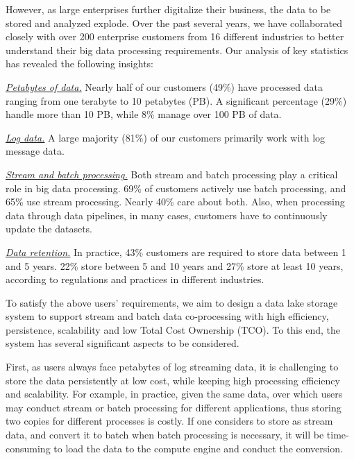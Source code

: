 However, as large enterprises further digitalize their business, the data to be stored and analyzed explode. Over the past several years, we have collaborated closely with over 200 enterprise customers from 16 different industries to better understand their big data processing requirements. Our analysis of key statistics has revealed the following insights:

\noindent \underline{\textit{Petabytes of data.}} Nearly half of our customers (49\%) have processed data ranging from one terabyte to 10 petabytes (PB). A significant percentage (29\%) handle more than 10 PB, while 8\% manage over 100 PB of data.


\noindent \underline{\textit{Log data.}} A large majority (81\%) of our customers primarily work with log message data.

\noindent \underline{\textit{Stream and batch processing.}} Both stream and batch processing play a critical role in big data processing. 69\% of  customers actively use batch processing, and 65\% use stream processing. Nearly 40\%  care about both. 
Also, when processing data through data pipelines, in many cases, customers  have to continuously  update the datasets.

\noindent \underline{\textit{Data retention.}} In practice, 43\% customers are required to store data between 1 and 5 years. 22\% store between 5 and 10 years and 27\% store at least 10 years, according to regulations and practices in different industries.




To satisfy the above users' requirements, we aim to design a data lake storage system to support stream and batch data co-processing with high efficiency, persistence, scalability and low Total Cost Ownership (TCO). To this end, the system has several significant aspects  to be considered. 

 First, as users always face petabytes of log streaming data, it is challenging to store the data persistently at low cost, while keeping high processing efficiency and scalability. For example, in practice, given the same data, over which users may conduct stream or batch processing for different applications, thus storing two copies for different processes is costly.
 If one considers to store as stream data, and convert it to batch when batch processing is necessary, it will be time-consuming to load the data to the compute engine and conduct the conversion.	


